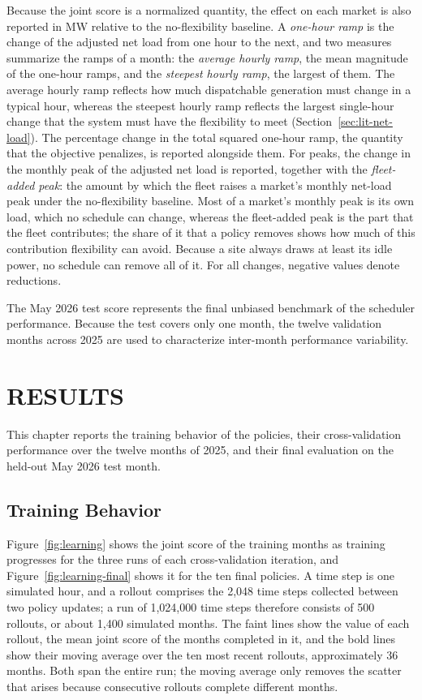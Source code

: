 \documentclass{UNCC-thesis}
\begin{document}
Because the joint score is a normalized quantity, the effect on each market is also reported in
MW relative to the no-flexibility baseline. A \emph{one-hour ramp} is the change of the adjusted
net load from one hour to the next, and two measures summarize the ramps of a month: the
\emph{average hourly ramp}, the mean magnitude of the one-hour ramps, and the \emph{steepest
hourly ramp}, the largest of them. The average hourly ramp reflects how much dispatchable
generation must change in a typical hour, whereas the steepest hourly ramp reflects the largest
single-hour change that the system must have the flexibility to meet
(Section~\ref{sec:lit-net-load}). The percentage change in the total squared one-hour ramp, the
quantity that the objective penalizes, is reported alongside them. For peaks, the change in the
monthly peak of the adjusted net load is reported, together with the \emph{fleet-added peak}: the
amount by which the fleet raises a market's monthly net-load peak under the no-flexibility
baseline. Most of a market's monthly peak is its own load, which no schedule can change, whereas
the fleet-added peak is the part that the fleet contributes; the share of it that a policy
removes shows how much of this contribution flexibility can avoid. Because a site always draws
at least its idle power, no schedule can remove all of it. For all changes, negative values
denote reductions.

The May 2026 test score represents the final unbiased benchmark of the scheduler performance.
Because the test covers only one month, the twelve validation months across 2025
are used to characterize inter-month performance variability.

\chapter{RESULTS}
\label{chap:results}

This chapter reports the training behavior of the policies, their cross-validation performance
over the twelve months of 2025, and their final evaluation on the held-out May 2026 test month.

\section{Training Behavior}
\label{sec:results-training}

Figure~\ref{fig:learning} shows the joint score of the training months as training progresses for
the three runs of each cross-validation iteration, and Figure~\ref{fig:learning-final} shows it for
the ten final policies. A time step is one simulated hour, and a rollout comprises the 2,048 time
steps collected between two policy updates; a run of 1,024,000 time steps therefore consists of
500 rollouts, or about 1,400 simulated months. The faint lines show the value of each rollout, the
mean joint score of the months completed in it, and the bold lines show their moving average over
the ten most recent rollouts, approximately 36 months. Both span the entire run; the moving
average only removes the scatter that arises because consecutive rollouts complete different
months.
\end{document}
